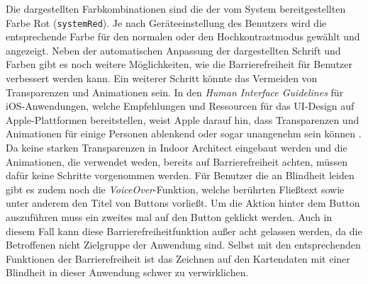 Die dargestellten Farbkombinationen sind die der vom System bereitgestellten Farbe Rot (\texttt{systemRed}).
Je nach Geräteeinstellung des Benutzers wird die entsprechende Farbe für den normalen oder den Hochkontrastmodus gewählt und angezeigt.\pbreak%
%
Neben der automatischen Anpassung der dargestellten Schrift und Farben gibt es noch weitere Möglichkeiten, wie die Barrierefreiheit für Benutzer verbessert werden kann.
Ein weiterer Schritt könnte das Vermeiden von Transparenzen und Animationen sein.
In den \emph{Human Interface Guidelines} für iOS-Anwendungen, welche Empfehlungen und Ressourcen für das UI-Design auf Apple-Plattformen bereitstellen, weist Apple darauf hin, dass Transparenzen und Animationen für einige Personen ablenkend oder sogar unangenehm sein können \parencite{APP2020a}.
Da keine starken Transparenzen in Indoor Architect eingebaut werden und die Animationen, die verwendet weden, bereits auf Barrierefreiheit achten, müssen dafür keine Schritte vorgenommen werden.
Für Benutzer die an Blindheit leiden gibt es zudem noch die \emph{VoiceOver}-Funktion, welche berührten Fließtext sowie unter anderem den Titel von Buttons vorließt.
Um die Aktion hinter dem Button auszuführen muss ein zweites mal auf den Button geklickt werden.
Auch in diesem Fall kann diese Barrierefreiheitfunktion außer acht gelassen werden, da die Betroffenen nicht Zielgruppe der Anwendung sind.
Selbst mit den entsprechenden Funktionen der Barrierefreiheit ist das Zeichnen auf den Kartendaten mit einer Blindheit in dieser Anwendung schwer zu verwirklichen.

